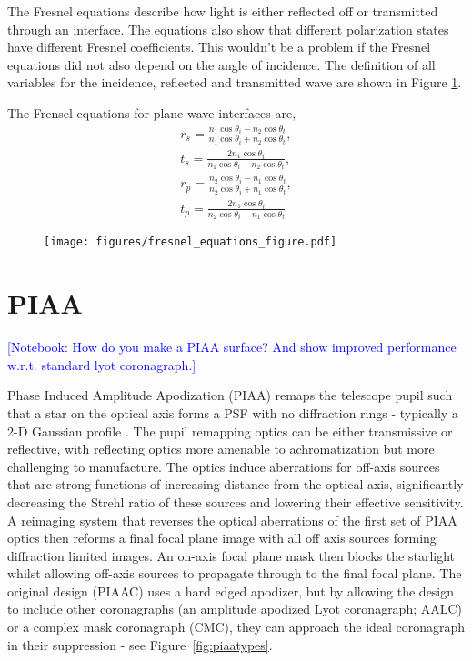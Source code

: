 \documentclass[letterpaper]{ar-1col}
\newcommand{\notebooksuggestion}[1]{\textcolor{blue}{[Notebook: #1]}}
\begin{document}
The Fresnel equations describe how light is either reflected off or transmitted through an interface. The equations also show that different polarization states have different Fresnel coefficients. This wouldn't be a problem if the Fresnel equations did not also depend on the angle of incidence. The definition of all variables for the incidence, reflected and transmitted wave are shown in Figure \ref{fig:fresnel_equations}.

The Frensel equations for plane wave interfaces are,
\begin{align}
r_s = \frac{n_1\cos{\theta_i} - n_2\cos{\theta_t}}{n_1\cos{\theta_i} + n_2\cos{\theta_t}},\\
t_s = \frac{2n_1 \cos{\theta_i}}{n_1\cos{\theta_i} + n_2\cos{\theta_t}},\\
r_p = \frac{n_2\cos{\theta_i} - n_1\cos{\theta_t}}{n_2\cos{\theta_i} + n_1\cos{\theta_t}},\\
t_p = \frac{2n_1 \cos{\theta_i}}{n_2\cos{\theta_i} + n_1\cos{\theta_t}}
\end{align}

\begin{figure}[ht]
  \centering
  \texttt{[image: figures/fresnel\_equations\_figure.pdf]}
  \caption{}
  \label{fig:fresnel_equations}
\end{figure}

\section{PIAA}\label{sec:piaa}

\notebooksuggestion{How do you make a PIAA surface? And show improved performance w.r.t. standard lyot coronagraph.}

Phase Induced Amplitude Apodization (PIAA) remaps the telescope pupil such that a star on the optical axis forms a PSF with no diffraction rings - typically a 2-D Gaussian profile \citep{Guyon03,Guyon05,Guyon14}.
%
The pupil remapping optics can be either transmissive or reflective, with reflecting optics more amenable to achromatization but more challenging to manufacture.
%
The optics induce aberrations for off-axis sources that are strong functions of increasing distance from the optical axis, significantly decreasing the Strehl ratio of these sources and lowering their effective sensitivity.
%
A reimaging system that reverses the optical aberrations of the first set of PIAA optics then reforms a final focal plane image with all off axis sources forming diffraction limited images.
%
An on-axis focal plane mask then blocks the starlight whilst allowing off-axis sources to propagate through to the final focal plane.
%
The original design (PIAAC) uses a hard edged apodizer, but by allowing the design to include other coronagraphs (an amplitude apodized Lyot coronagraph; AALC) or a complex mask coronagraph (CMC), they can approach the ideal coronagraph in their suppression - see Figure~\ref{fig:piaatypes}.
\end{document}
